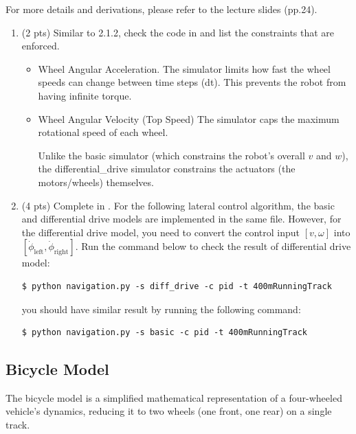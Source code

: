 \documentclass[11pt]{article}
\begin{document}
For more details and derivations, please refer to the lecture slides (pp.24).
\begin{enumerate}
    \item \textbf{\faPen} (2 pts) Similar to 2.1.2, check the code in \textcolor{teal}{\texttt{\allowbreak{}}} and list the constraints that are enforced.
          \begin{itemize}
            \color{blue}
                \item Wheel Angular Acceleration. The simulator limits how fast the wheel speeds can change between time steps (dt). This prevents the robot from having infinite torque.
                \item Wheel Angular Velocity (Top Speed) The simulator caps the maximum rotational speed of each wheel.

                Unlike the basic simulator (which constrains the robot's overall $v$ and $w$), the differential\_drive simulator constrains the actuators (the motors/wheels) themselves. 
                
          \end{itemize}
    \item \textbf{\faPython} (4 pts) Complete \textcolor{teal}{\texttt{}} in \textcolor{teal}{\texttt{}}.
          For the following lateral control algorithm, the basic and differential drive models are implemented in the same file. However, for the differential drive model, you need to convert the control input $[v, \omega]$ into $[\dot{\phi}_{\mathrm{left}}, \dot{\phi}_{\mathrm{right}}]$.
          Run the command below to check the result of differential drive model:
          \begin{lstlisting}
$ python navigation.py -s diff_drive -c pid -t 400mRunningTrack
          \end{lstlisting}

          you should have similar result by running the following command:
          \begin{lstlisting}
$ python navigation.py -s basic -c pid -t 400mRunningTrack
          \end{lstlisting}

\end{enumerate}



\subsection{Bicycle Model}
\noindent The bicycle model is a simplified mathematical representation of a four-wheeled vehicle’s dynamics, reducing it to two wheels (one front, one rear) on a single track. \\
\end{document}

